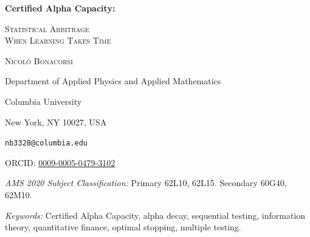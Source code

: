 \documentclass[11pt]{article}
\numberwithin{equation}{section}
\theoremstyle{plain}
\theoremstyle{definition}
\theoremstyle{remark}
\begin{document}
\begin{center}
\vspace*{0.20em}
{\fontsize{24}{28}\selectfont\bfseries Certified Alpha Capacity:\par}
\vspace{0.35em}
{\fontsize{15}{18}\selectfont\scshape
Statistical Arbitrage\\[-0.08em]
When Learning Takes Time\par}

\vspace{1.15em}
{\large\scshape Nicolò Bonacorsi\par}
\vspace{0.20em}
{\normalsize Department of Applied Physics and Applied Mathematics\par}
{\normalsize Columbia University\par}
{\small New York, NY 10027, USA\par}
\vspace{0.30em}
{\small \texttt{nb3328@columbia.edu}\par}
{\small ORCID: \href{https://orcid.org/0009-0005-0479-3102}{0009-0005-0479-3102}\par}
\end{center}

\vspace{0.65em}
\begin{abstract}
Statistical validation takes time, and alpha can decay before the evidence justifies deployment. We quantify the surviving opportunity through Certified Alpha Capacity: the maximum expected value remaining under prescribed false-deployment and power constraints. In a canonical Gaussian experiment, we derive an exact certification frontier and the sharp law $\mathcal K_{\alpha,\beta}/\log(1/\varepsilon)$ for residual information capacity just above it. Near the frontier, a single interim decision can preserve orders of magnitude more capacity than fixed-time testing. Mapping information into cash reveals why equally certifiable signals can retain different economic values. In the specified competitive equilibrium, lifetime information approaches the certification frontier exponentially as research costs vanish.
\end{abstract}

\vspace{0.30em}
\noindent\textit{AMS 2020 Subject Classification:} Primary 62L10, 62L15. Secondary 60G40, 62M10.

\vspace{0.40em}
\noindent\textit{Keywords:} Certified Alpha Capacity, alpha decay, sequential testing, information theory, quantitative finance, optimal stopping, multiple testing.
\end{document}
